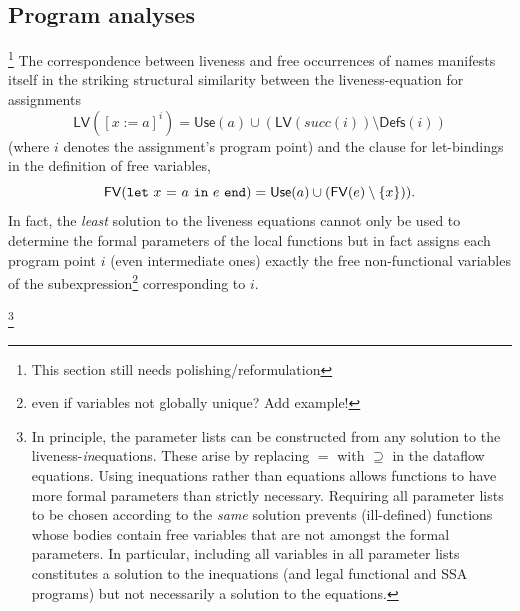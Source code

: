 \subsection{Program analyses}
\footnote{This section still needs polishing/reformulation}
The correspondence between liveness and free occurrences of names
manifests itself in the striking structural similarity between the
liveness-equation for assignments $$\mathsf{LV}([x:=a]^i) =
\mathsf{Use}(a) \cup (\mathsf{LV}(\mathit{succ}(i)) \setminus \mathsf{Defs}(i))$$ 
(where $i$ denotes the assignment's program point) and the clause for
let-bindings
in the definition of free variables,
$$\mathsf{FV}(\mathtt{let}\ {x}\ \mathtt{=}\ {a}\ \mathtt{in}\ {e}\ \mathtt{end}) = \mathsf{Use}(a) \cup (\mathsf{FV}(e) \setminus
\{x\})).
$$ In fact, the \emph{least} solution to the liveness equations cannot
only be used to determine the formal parameters of the local functions
but in fact assigns each program point $i$ (even intermediate ones)
exactly the free non-functional variables of the
subexpression\footnote{even if variables not globally unique? Add
example!}  corresponding to $i$.

\footnote{In principle, the parameter lists can be
constructed from any solution to the
liveness-\emph{in}equations. These arise by replacing $=$ with
$\supseteq$ in the dataflow equations. Using inequations rather than
equations allows functions to have more formal parameters than
strictly necessary. Requiring all parameter lists to be chosen
according to the
\emph{same} solution prevents (ill-defined) functions whose bodies contain free
variables that are not amongst the formal parameters.  In particular,
including all variables in all parameter lists constitutes a solution
to the inequations (and legal functional and SSA programs) but not
necessarily a solution to the equations.}

